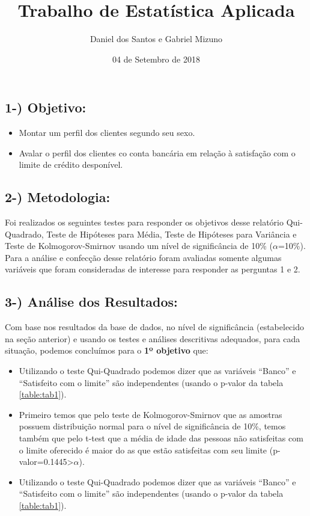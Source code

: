 \documentclass[]{article}
\title{Trabalho de Estatística Aplicada}
\author{Daniel dos Santos e Gabriel Mizuno}
\date{04 de Setembro de 2018}
\providecommand{\tightlist}{%
  \setlength{\itemsep}{0pt}\setlength{\parskip}{0pt}}
\begin{document}
\maketitle

{
\setcounter{tocdepth}{3}
\tableofcontents
}
\subsection{1-) Objetivo:}\label{objetivo}

\begin{itemize}
\tightlist
\item
  Montar um perfil dos clientes segundo seu sexo.\\
\item
  Avalar o perfil dos clientes co conta bancária em relação à satisfação
  com o limite de crédito desponível.
\end{itemize}

\subsection{2-) Metodologia:}\label{metodologia}

Foi realizados os seguintes testes para responder os objetivos desse
relatório Qui-Quadrado, Teste de Hipóteses para Média, Teste de
Hipóteses para Variância e Teste de Kolmogorov-Smirnov usando um nível
de significância de 10\% (\(\alpha\)=10\%). Para a análise e confecção
desse relatório foram avaliadas somente algumas variáveis que foram
consideradas de interesse para responder as perguntas 1 e 2.

\subsection{3-) Análise dos Resultados:}\label{analise-dos-resultados}

Com base nos resultados da base de dados, no nível de significância
(estabelecido na seção anterior) e usando os testes e análises
descritivas adequados, para cada situação, podemos concluímos para o
\textbf{1º objetivo} que:

\begin{itemize}
\tightlist
\item
  Utilizando o teste Qui-Quadrado podemos dizer que as variáveis
  ``Banco'' e ``Satisfeito com o limite'' são independentes (usando o
  p-valor da tabela \ref{table:tab1}).
\item
  Primeiro temos que pelo teste de Kolmogorov-Smirnov que as amostras
  possuem distribuição normal para o nível de significância de 10\%,
  temos também que pelo t-test que a média de idade das pessoas não
  satisfeitas com o limite oferecido é maior do as que estão satisfeitas
  com seu limite (p-valor=0.1445\textgreater{}\(\alpha\)).
\item
  Utilizando o teste Qui-Quadrado podemos dizer que as variáveis
  ``Banco'' e ``Satisfeito com o limite'' são independentes (usando o
  p-valor da tabela \ref{table:tab1}).
\end{itemize}
\end{document}

